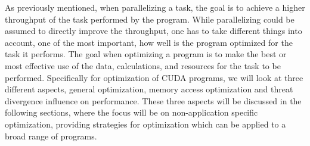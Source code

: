 As previously mentioned, when parallelizing a task, the goal is to achieve a higher throughput of the task performed by the program. While parallelizing could be assumed to directly improve the throughput, one has to take different things into account, one of the most important, how well is the program optimized for the task it performs. The goal when optimizing a program is to make the best or most effective use of the data, calculations, and resources for the task to be performed. Specifically for optimization of CUDA programs, we will look at three different aspects, general optimization, memory access optimization and threat divergence influence on performance. These three aspects will be discussed in the following sections, where the focus will be on non-application specific optimization, providing strategies for optimization which can be applied to a broad range of programs. 